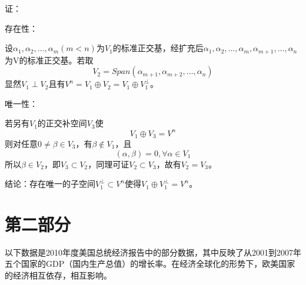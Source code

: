 \documentclass[a4paper, 12pt]{article}
\begin{document}
证：

存在性：

设\begin{math}\alpha_{1}, \alpha_{2}, \ldots, \alpha_{m}(m < n)为V_{1}\end{math}的标准正交基，经扩充后\begin{math}\alpha_{1},\alpha_{2}, \ldots, \alpha_{m}, \alpha_{m+1}, \ldots, \alpha_{n}\end{math}为V的标准正交基。若取\begin{displaymath}V_{2} = Span(\alpha_{m+1}, \alpha_{m+2}, \ldots, \alpha_{n})\end{displaymath}显然\begin{math}V_{1}\perp V_{2}且有V^{n} = V_{1}\oplus V_{2} = V_{1}\oplus V_{1}^{\bot}\end{math}。

唯一性：

若另有\begin{math}V_{1}\end{math}的正交补空间\begin{math}V_{3}\end{math}使\begin{displaymath}V_{1}\oplus V_{3} = V^{n}\end{displaymath}则对任意\begin{math}0\ne\beta\in V_{3}\end{math}，有\begin{math}\beta\notin V_{1}\end{math}，且\begin{displaymath}(\alpha, \beta) = 0, \forall\alpha\in V_{1}\end{displaymath}所以\begin{math}\beta\in V_{2}，即V_{3}\subset V_{2}，同理可证V_{2}\subset V_{3}，故有V_{2} = V_{3}\end{math}。

结论：存在唯一的子空间\begin{math}V_{1}^{\bot}\subset V^{n}\end{math}使得\begin{math}V_{1}\oplus V_{1}^{\bot} = V^{n}\end{math}。
\newpage
\section{第二部分}
以下数据是2010年度美国总统经济报告中的部分数据，其中反映了从2001到2007年五个国家的GDP（国内生产总值）的增长率。在经济全球化的形势下，欧美国家的经济相互依存，相互影响。
\end{document}
